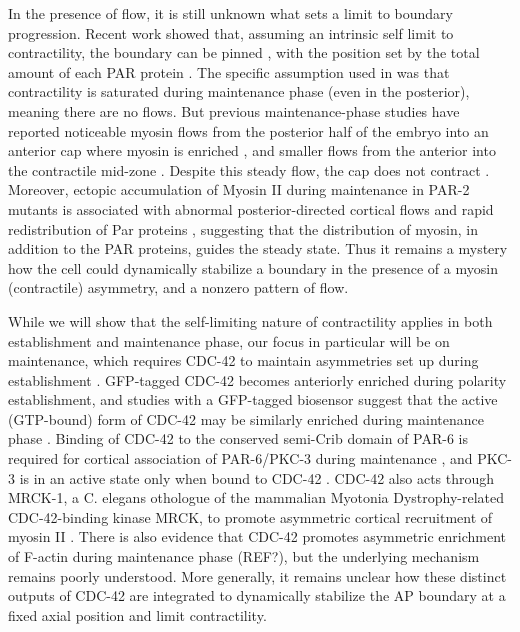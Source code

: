 \documentclass[11pt]{article}
\newcommand{\6}[1]{#1_{\text{6}}}
\newcommand{\3}[1]{#1_{\text{3}}}
\begin{document}
In the presence of flow, it is still unknown what sets a limit to boundary progression. Recent work showed that, assuming an intrinsic self limit to contractility, the boundary can be pinned \citep{gross2019guiding}, with the position set by the total amount of each PAR protein \citep{goehring2011polarization}. The specific assumption used in \citep{gross2019guiding} was that contractility is saturated during maintenance phase (even in the posterior), meaning there are no flows. But previous maintenance-phase studies have reported noticeable myosin flows from the posterior half of the embryo into an anterior cap where myosin is enriched \citep{sailer2015dynamic}, and smaller flows from the anterior into the contractile mid-zone \citep{small2017proteins}. Despite this steady flow, the cap does not contract \citep{sailer2015dynamic}. Moreover, ectopic accumulation of Myosin II during maintenance in PAR-2 mutants is associated with abnormal posterior-directed cortical flows and rapid redistribution of Par proteins \citep{munro2004cortical}, suggesting that the distribution of myosin, in addition to the PAR proteins, guides the steady state. Thus it remains a mystery how the cell could dynamically stabilize a boundary in the presence of a myosin (contractile) asymmetry, and a nonzero pattern of flow.

While we will show that the self-limiting nature of contractility applies in both establishment and maintenance phase, our focus in particular will be on maintenance, which requires CDC-42 to maintain asymmetries set up during establishment \citep{kay2001cdc, gotta2001cdc,aceto2006interaction, schonegg2006cdc, motegi2006sequential}. GFP-tagged CDC-42 becomes anteriorly enriched during polarity establishment, and studies with a GFP-tagged biosensor suggest that the active (GTP-bound) form of CDC-42 may be similarly enriched during maintenance phase \citep{kumfer2010cgef}.  Binding of CDC-42 to the conserved semi-Crib domain of PAR-6 is required for cortical association of PAR-6/PKC-3 during maintenance \citep{aceto2006interaction}, and PKC-3 is in an active state only when bound to CDC-42 \citep{sailer2015dynamic,lang2017proteins,rodriguez2017apkc}. CDC-42 also acts through MRCK-1, a C. elegans othologue of the mammalian Myotonia Dystrophy-related CDC-42-binding kinase MRCK, to promote asymmetric cortical recruitment of myosin II \citep{kumfer2010cgef}.  There is also evidence that CDC-42 promotes asymmetric enrichment of F-actin during maintenance phase (REF?), but the underlying mechanism remains poorly understood.  More generally, it remains unclear how these distinct outputs of CDC-42 are integrated to dynamically stabilize the AP boundary at a fixed axial position and limit contractility. 
\end{document}
